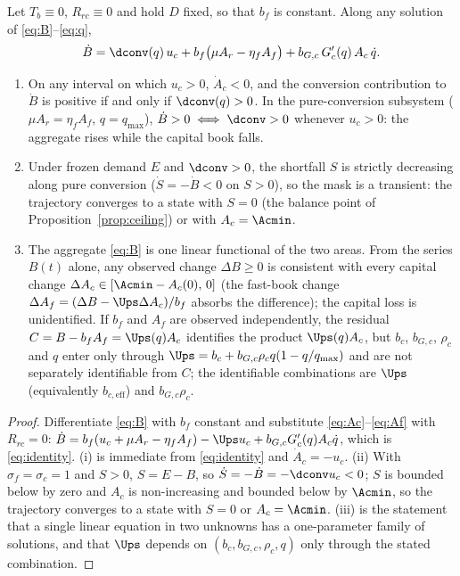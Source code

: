 \begin{proposition}\label{prop:mask}
Let $T_b\equiv0$, $R_{rc}\equiv0$ and hold $D$ fixed, so that $b_f$ is constant. Along any solution of \eqref{eq:B}--\eqref{eq:q},
\begin{equation}\label{eq:identity}
\dot B=\dconv(q)\,u_c+b_f\big(\mu A_r-\eta_f A_f\big)+b_{G,c}\,G_c'(q)\,A_c\,\dot q .
\end{equation}
\begin{enumerate}[label=(\roman*)]
\item On any interval on which $u_c>0$, $\dot A_c<0$, and the conversion contribution to $\dot B$ is positive if and only if $\dconv(q)>0$. In the pure-conversion subsystem ($\mu A_r=\eta_f A_f$, $q=q_{\max}$), $\dot B>0\iff\dconv>0$ whenever $u_c>0$: the aggregate rises while the capital book falls.
\item Under frozen demand $E$ and $\dconv>0$, the shortfall $S$ is strictly decreasing along pure conversion ($\dot S=-\dot B<0$ on $S>0$), so the mask is a transient: the trajectory converges to a state with $S=0$ (the balance point of Proposition~\ref{prop:ceiling}) or with $A_c=\Acmin$.
\item The aggregate \eqref{eq:B} is one linear functional of the two areas. From the series $B(t)$ alone, any observed change $\Delta B\ge0$ is consistent with every capital change $\Delta A_c\in[\Acmin-A_c(0),\,0]$ (the fast-book change $\Delta A_f=(\Delta B-\Ups\Delta A_c)/b_f$ absorbs the difference); the capital loss is unidentified. If $b_f$ and $A_f$ are observed independently, the residual $C=B-b_fA_f=\Ups(q)A_c$ identifies the product $\Ups(q)A_c$, but $b_c$, $b_{G,c}$, $\rho_c$ and $q$ enter only through $\Ups=b_c+b_{G,c}\rho_c q(1-q/q_{\max})$ and are not separately identifiable from $C$; the identifiable combinations are $\Ups$ (equivalently $b_{c,\mathrm{eff}}$) and $b_{G,c}\rho_c$.
\end{enumerate}
\end{proposition}

\begin{proof}
Differentiate \eqref{eq:B} with $b_f$ constant and substitute \eqref{eq:Ac}--\eqref{eq:Af} with $R_{rc}=0$: $\dot B=b_f(u_c+\mu A_r-\eta_fA_f)-\Ups u_c+b_{G,c}G_c'(q)A_c\dot q$, which is \eqref{eq:identity}. (i) is immediate from \eqref{eq:identity} and $\dot A_c=-u_c$. (ii) With $\sigma_f=\sigma_c=1$ and $S>0$, $S=E-B$, so $\dot S=-\dot B=-\dconv u_c<0$; $S$ is bounded below by zero and $A_c$ is non-increasing and bounded below by $\Acmin$, so the trajectory converges to a state with $S=0$ or $A_c=\Acmin$. (iii) is the statement that a single linear equation in two unknowns has a one-parameter family of solutions, and that $\Ups$ depends on $(b_c,b_{G,c},\rho_c,q)$ only through the stated combination.
\end{proof}


